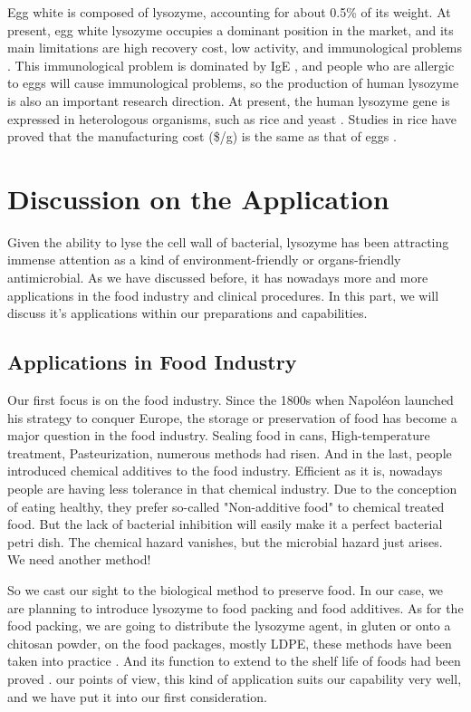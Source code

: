 Egg white is composed of lysozyme, accounting for about 0.5\% of its weight. At present, egg white lysozyme occupies a dominant position in the market, and its main limitations are high recovery cost, low activity, and immunological problems \citep{Ercan2016}. This immunological problem is dominated by IgE \citep{Urisu2015}, and people who are allergic to eggs will cause immunological problems, so the production of human lysozyme is also an important research direction. At present, the human lysozyme gene is expressed in heterologous organisms, such as rice \citep{R.Wilken2011} and yeast \citep{Huang2009}. Studies in rice have proved that the manufacturing cost (\$/g) is the same as that of eggs \citep{R.Wilken2011}.



\section{Discussion on the Application}
Given the ability to lyse the cell wall of bacterial,
lysozyme has been attracting immense attention as a kind of 
environment-friendly or organs-friendly antimicrobial.
As we have discussed before, it has nowadays more and more applications in the food industry and clinical procedures. In this part, we will discuss 
it's applications within our preparations and capabilities.

\subsection{Applications in Food Industry}
Our first focus is on the food industry. Since the 1800s when Napoléon launched his strategy to conquer Europe, the storage or preservation of food has become a major question in the food industry. Sealing food in cans, High-temperature treatment, Pasteurization, numerous methods had risen. And in the last, people introduced chemical additives to the food industry. Efficient as it is, nowadays people are having less tolerance in that chemical industry. Due to the conception of eating healthy, they prefer so-called "Non-additive food" to chemical treated food. But the lack of bacterial inhibition will easily make it a perfect bacterial petri dish. The chemical hazard vanishes, but the microbial hazard just arises. We need another method!

So we cast our sight to the biological method to preserve food. In our case, we are planning to introduce lysozyme to food packing and food additives. As for the food packing, we are going to distribute the lysozyme agent, in gluten \citep{Conte2006} or onto a chitosan powder, on the food packages, mostly LDPE, these methods have been taken into practice \citep{Borzooeian2017}. And its function to extend to the shelf life of foods had been proved \citep{Lian2012, Alhazmi2014}. our points of view, this kind of application suits our capability very well, and we have put it into our first consideration.


